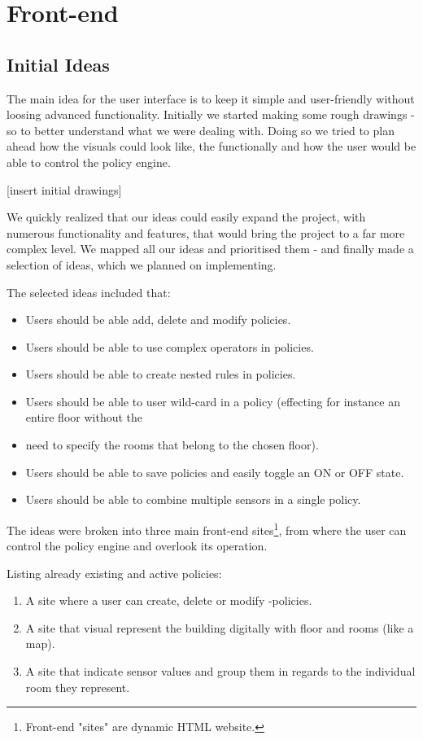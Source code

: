 \section{Front-end}
\label{sec:front-end}
\subsection{Initial Ideas}

The main idea for the user interface is to keep it simple and user-friendly without loosing advanced functionality. Initially we started making some rough drawings -so to better understand what we were dealing with. Doing so we tried to plan ahead how the visuals could look like, the functionally and how the user would be able to control the policy engine.

[insert initial drawings]

We quickly realized that our ideas could easily expand the project, with numerous functionality and features, that would bring the project to a far more complex level. We mapped all our ideas and prioritised them - and finally made a selection of ideas, which we planned on implementing.

The selected ideas included that:
\begin{itemize}
\item Users should be able add, delete and modify policies.
\item Users should be able to use complex operators in policies.
\item Users should be able to create nested rules in policies.
\item Users should be able to user wild-card in a policy (effecting for instance an entire floor without the \item need to specify the rooms that belong to the chosen floor).
\item Users should be able to save policies and easily toggle an ON or OFF state.
\item Users should be able to combine multiple sensors in a single policy.
\end{itemize}

The ideas were broken into three main front-end sites\footnote{Front-end "sites" are dynamic HTML website.}, from where the user can control the policy engine and overlook its operation.

Listing already existing and active policies:
\begin{enumerate}
\item A site where a user can create, delete or modify -policies.
\item A site that visual represent the building digitally with floor and rooms (like a map).
\item A site that indicate sensor values and group them in regards to the individual room they represent.
\end{enumerate}



